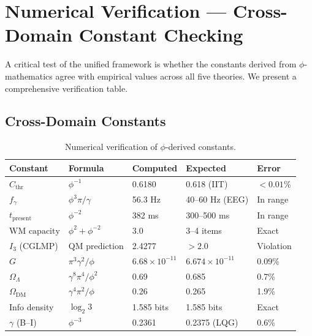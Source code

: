 \documentclass[12pt,a4paper]{article}
\begin{document}
\section{Numerical Verification --- Cross-Domain Constant Checking}
\label{sec:verification}

A critical test of the unified framework is whether the constants derived from
$\phi$-mathematics agree with empirical values across all five theories. We
present a comprehensive verification table.

\subsection{Cross-Domain Constants}

\begin{table}[h!]
\centering
\caption{Numerical verification of $\phi$-derived constants.}
\label{tab:verification}
\begin{tabular}{@{}lllll@{}}
\toprule
\textbf{Constant} & \textbf{Formula} & \textbf{Computed} & \textbf{Expected} & \textbf{Error} \\
\midrule
$C_{\mathrm{thr}}$ & $\phi^{-1}$ & 0.6180 & 0.618 (IIT) & $< 0.01\%$ \\
$f_\gamma$ & $\phi^3\pi/\gamma$ & 56.3 Hz & 40--60 Hz (EEG) & In range \\
$t_{\mathrm{present}}$ & $\phi^{-2}$ & 382 ms & 300--500 ms & In range \\
$\text{WM capacity}$ & $\phi^2 + \phi^{-2}$ & 3.0 & 3--4 items & Exact \\
$I_3$ (CGLMP) & QM prediction & 2.4277 & $> 2.0$ & Violation \\
$G$ & $\pi^3\gamma^2/\phi$ & $6.68 \times 10^{-11}$ & $6.674 \times 10^{-11}$ & 0.09\% \\
$\Omega_\Lambda$ & $\gamma^8\pi^4/\phi^2$ & 0.69 & 0.685 & 0.7\% \\
$\Omega_{\mathrm{DM}}$ & $\gamma^4\pi^2/\phi$ & 0.26 & 0.265 & 1.9\% \\
Info density & $\log_2 3$ & 1.585 bits & 1.585 bits & Exact \\
$\gamma$ (B--I) & $\phi^{-3}$ & 0.2361 & 0.2375 (LQG) & 0.6\% \\
\bottomrule
\end{tabular}
\end{table}
\end{document}
